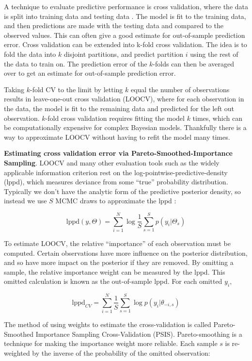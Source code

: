 \documentclass[11pt, oneside, openany]{scrbook}
\begin{document}
A technique to evaluate predictive performance is cross validation, where the data is split into training data and testing data \citep{friedman2001elements}. The model is fit to the training data, and then predictions are made with the testing data and compared to the observed values. This can often give a good estimate for out-of-sample prediction error. Cross validation can be extended into k-fold cross validation. The idea is to fold the data into \(k\) disjoint partitions, and predict partition \(i\) using the rest of the data to train on. The prediction error of the \(k\)-folds can then be averaged over to get an estimate for out-of-sample prediction error.

Taking \(k\)-fold CV to the limit by letting \(k\) equal the number of observations results in leave-one-out cross validation (LOOCV), where for each observation in the data, the model is fit to the remaining data and predicted for the left out observation. \(k\)-fold cross validation requires fitting the model \(k\) times, which can be computationally expensive for complex Bayesian models. Thankfully there is a way to approximate LOOCV without having to refit the model many times.

\textbf{Estimating cross validation error via Pareto-Smoothed-Importance Sampling}. LOOCV and many other evaluation tools such as the widely applicable information criterion \citep{watanabe2013widely} rest on the log-pointwise-predictive-density (lppd), which measures deviance from some ``true'' probability distribution. Typically we don't have the analytic form of the predictive posterior density, so instead we use \(S\) MCMC draws to approximate the lppd \citep{vehtari2017practical}:

\begin{equation}
\mathrm{lppd}(y, \Theta) = \sum_{i=1}^N \log \frac{1}{S} \sum_{s=1}^S p(y_i | \Theta_s)
\label{eq:lppd}
\end{equation}

To estimate LOOCV, the relative ``importance'' of each observation must be computed. Certain observations have more influence on the posterior distribution, and so have more impact on the posterior if they are removed. By omitting a sample, the relative importance weight can be measured by the lppd. This omitted calculation is known as the out-of-sample lppd. For each omitted \(y_i\),

\[
\mathrm{lppd}_{CV} = \sum_{i=1}^N \frac{1}{S} \sum_{s=1}^S \log p(y_{i} | \theta_{-i,s})
\]

The method of using weights to estimate the cross-validation is called Pareto-Smoothed Importance Sampling Cross-Validation (PSIS). Pareto-smoothing is a technique for making the importance weight more reliable. Each sample \(s\) is re-weighted by the inverse of the probability of the omitted observation:
\end{document}
